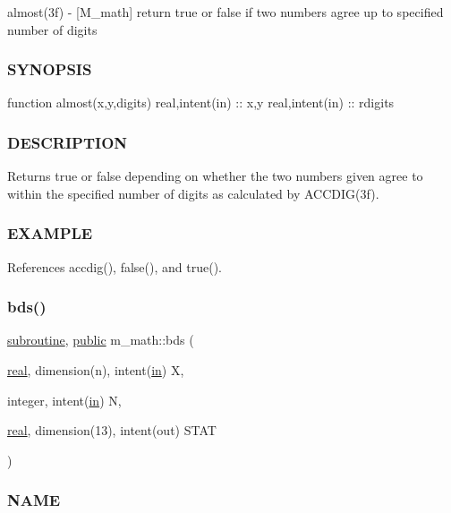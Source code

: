 almost(3f) -\/ \mbox{[}M\+\_\+math\mbox{]} return true or false if two numbers agree up to specified number of digits \subsubsection*{S\+Y\+N\+O\+P\+S\+IS}

function almost(x,y,digits) real,intent(in) \+:\+: x,y real,intent(in) \+:\+: rdigits \subsubsection*{D\+E\+S\+C\+R\+I\+P\+T\+I\+ON}

Returns true or false depending on whether the two numbers given agree to within the specified number of digits as calculated by A\+C\+C\+D\+I\+G(3f). \subsubsection*{E\+X\+A\+M\+P\+LE}

References accdig(), false(), and true().

\mbox{\label{namespacem__math_a5298e196ca91a45fd9cff36e1b8e188a}} 
\subsubsection{\texorpdfstring{bds()}{bds()}}
{\footnotesize\ttfamily \hyperlink{M__stopwatch_83_8txt_acfbcff50169d691ff02d4a123ed70482}{subroutine}, \hyperlink{M__stopwatch_83_8txt_a2f74811300c361e53b430611a7d1769f}{public} m\+\_\+math\+::bds (\begin{DoxyParamCaption}\item[{\hyperlink{read__watch_83_8txt_abdb62bde002f38ef75f810d3a905a823}{real}, dimension(n), intent(\hyperlink{M__journal_83_8txt_afce72651d1eed785a2132bee863b2f38}{in})}]{X,  }\item[{integer, intent(\hyperlink{M__journal_83_8txt_afce72651d1eed785a2132bee863b2f38}{in})}]{N,  }\item[{\hyperlink{read__watch_83_8txt_abdb62bde002f38ef75f810d3a905a823}{real}, dimension(13), intent(out)}]{S\+T\+AT }\end{DoxyParamCaption})}



\subsubsection*{N\+A\+ME}

